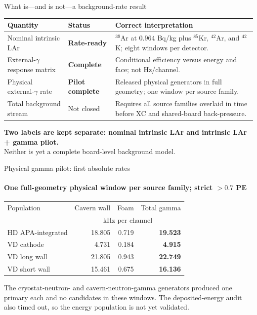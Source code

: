 \documentclass[aspectratio=169,11pt]{beamer}
\begin{document}
\begin{frame}{What is---and is not---a background-rate result}
  \footnotesize
  \setlength{\tabcolsep}{4pt}
  \renewcommand{\arraystretch}{1.06}
  \begin{tabular}{@{}p{}p{}p{}@{}}
    \toprule
    Quantity & Status & Correct interpretation \\
    \midrule
    Nominal intrinsic LAr & \textbf{Rate-ready} & $^{39}$Ar at $0.964$ Bq/kg plus $^{85}$Kr, $^{42}$Ar, and $^{42}$K; eight windows per detector. \\
    External-$\gamma$ response matrix & \textbf{Complete} & Conditional efficiency versus energy and face; not Hz/channel. \\
    Physical external-$\gamma$ rate & \textbf{Pilot complete} & Released physical generators in full geometry; one window per source family. \\
    Total background stream & Not closed & Requires all source families overlaid in time before XC and shared-board back-pressure. \\
    \bottomrule
  \end{tabular}

  \smallskip
  \centering
  \textbf{Two labels are kept separate: nominal intrinsic LAr and intrinsic LAr + gamma pilot.}\\
  Neither is yet a complete board-level background model.
\end{frame}

\begin{frame}{Physical gamma pilot: first absolute rates}
  \framesubtitle{One full-geometry physical window per source family; strict $>0.7$ PE}
  \small
  \setlength{\tabcolsep}{5pt}
  \renewcommand{\arraystretch}{1.20}
  \begin{tabular}{@{}lrrr@{}}
    \toprule
    Population & Cavern wall & Foam & Total gamma \\
    & \multicolumn{3}{c}{kHz per channel} \\
    \midrule
    HD APA-integrated & 18.805 & 0.719 & \textbf{19.523} \\
    VD cathode & 4.731 & 0.184 & \textbf{4.915} \\
    VD long wall & 21.805 & 0.943 & \textbf{22.749} \\
    VD short wall & 15.461 & 0.675 & \textbf{16.136} \\
    \bottomrule
  \end{tabular}

  \medskip
    {The cryostat-neutron- and cavern-neutron-gamma generators produced one primary each and no candidates in these windows. The deposited-energy audit also timed out, so the energy population is not yet validated.}
\end{frame}
\end{document}
